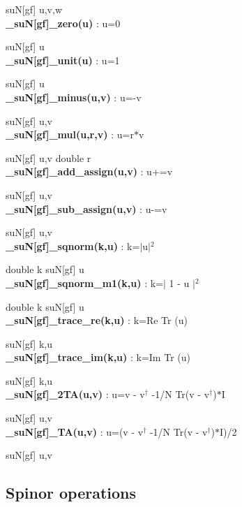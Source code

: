 \documentclass[10pt]{article}
\begin{document}
suN[gf] u,v,w\\


\noindent\textbf{\_suN[gf]\_zero(u) } : u=0 

suN[gf] u\\


\noindent\textbf{\_suN[gf]\_unit(u) } : u=1 

suN[gf] u\\


\noindent\textbf{\_suN[gf]\_minus(u,v) } : u=-v  

suN[gf] u,v\\


\noindent\textbf{\_suN[gf]\_mul(u,r,v) } : u=r$*$v 

suN[gf] u,v
double r\\


\noindent\textbf{\_suN[gf]\_add\_assign(u,v) } : u+=v 

suN[gf] u,v\\


\noindent\textbf{\_suN[gf]\_sub\_assign(u,v) } : u-=v  

suN[gf] u,v\\


\noindent\textbf{\_suN[gf]\_sqnorm(k,u) } : k=$|$u$|$$^2$

double  k
suN[gf] u\\


\noindent\textbf{\_suN[gf]\_sqnorm\_m1(k,u) } : k=$|$ 1 - u $|$$^2$

double  k
suN[gf] u\\


\noindent\textbf{\_suN[gf]\_trace\_re(k,u) } : k=Re Tr (u) 

suN[gf] k,u\\


\noindent\textbf{\_suN[gf]\_trace\_im(k,u) } : k=Im Tr (u) 

suN[gf] k,u\\


\noindent\textbf{\_suN[gf]\_2TA(u,v) } : u=v - v$^\dagger$ -1/N Tr(v - v$^\dagger$)$*$I 

suN[gf] u,v\\


\noindent\textbf{\_suN[gf]\_TA(u,v) } : u=(v - v$^\dagger$ -1/N Tr(v - v$^\dagger$)$*$I)/2

suN[gf] u,v


\subsection{Spinor operations}
\end{document}
